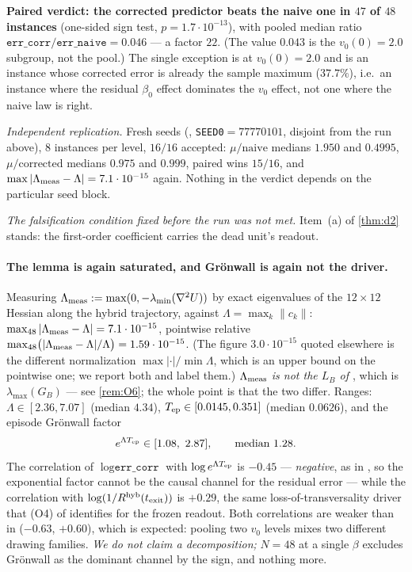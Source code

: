 \smallskip\noindent
\textbf{Paired verdict: the corrected predictor beats the naive one in $47$ of
$48$ instances} (one-sided sign test, $p=1.7\cdot10^{-13}$), with pooled median
ratio $\texttt{err\_corr}/\texttt{err\_naive}=\mathbf{0.046}$ --- a factor $22$.
(The value $0.043$ is the $v_0(0)=2.0$ subgroup, not the pool.) The single
exception is at $v_0(0)=2.0$ and is an instance whose corrected error is already
the sample maximum ($37.7\%$), i.e.\ an instance where the residual $\beta_0$
effect dominates the $v_0$ effect, not one where the naive law is right.

\smallskip\noindent
\emph{Independent replication.} Fresh seeds (,
\texttt{SEED0}$=77770101$, disjoint from the run above), $8$ instances per level,
$16/16$ accepted: $\mu/\text{naive}$ medians $1.950$ and $0.4995$,
$\mu/\text{corrected}$ medians $0.975$ and $0.999$, paired wins $15/16$, and
$\max|\Lambda_{\rm meas}-\Lambda|=7.1\cdot10^{-15}$ again. Nothing in the
verdict depends on the particular seed block.

\smallskip\noindent
\emph{The falsification condition fixed before the run was not met.} Item~(a) of
\cref{thm:d2} stands: the first-order coefficient carries the dead unit's
readout.

\paragraph{The lemma is again saturated, and Gr\"onwall is again not the driver.}
Measuring $\Lambda_{\rm meas}:=\max(0,-\lambda_{\min}(\nabla^2U))$ by exact
eigenvalues of the $12\times12$ Hessian along the hybrid trajectory, against
$\Lambda=\max_k\|c_k\|$: $\max_{48}|\Lambda_{\rm meas}-\Lambda|=7.1\cdot10^{-15}$,
pointwise relative $\max_{48}\bigl(|\Lambda_{\rm meas}-\Lambda|/\Lambda\bigr)
=1.59\cdot10^{-15}$. (The figure $3.0\cdot10^{-15}$ quoted elsewhere is the
different normalization $\max|\cdot|/\min\Lambda$, which is an upper bound on
the pointwise one; we report both and label them.) \emph{$\Lambda_{\rm meas}$ is
not the $L_B$ of \cite{paper}}, which is $\lambda_{\max}(G_B)$ --- see
\cref{rem:O6}; the whole point is that the two differ. Ranges: $\Lambda\in[2.36,7.07]$ (median $4.34$),
$T_{\mathrm{ep}}\in[0.0145,0.351]$ (median $0.0626$), and the episode Gr\"onwall factor
\[
e^{\Lambda\Tep}\in[1.08,\ 2.87],\qquad\text{median }1.28 .
\]
The correlation of $\log\texttt{err\_corr}$ with $\log e^{\Lambda T_{\mathrm{ep}}}$ is
$\mathbf{-0.45}$ --- \emph{negative}, as in \cite{scoping}, so the exponential
factor cannot be the causal channel for the residual error --- while the
correlation with $\log(1/R^{\mathrm{hyb}}(t_{\mathrm{exit}}))$ is $+0.29$, the same
loss-of-transversality driver that (O4) of \cite{paper} identifies for the
frozen readout. Both correlations are weaker than in \cite{scoping}
($-0.63$, $+0.60$), which is expected: pooling two $v_0$ levels mixes two
different drawing families. \emph{We do not claim a decomposition;} $N=48$ at a
single $\beta$ excludes Gr\"onwall as the dominant channel by the sign, and
nothing more.

